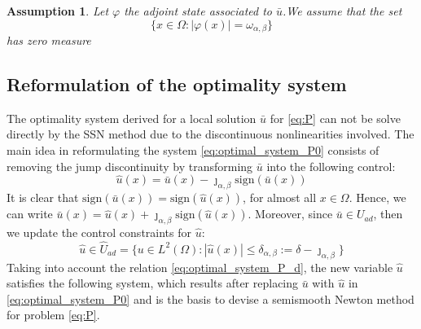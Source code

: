 \documentclass[11pt,a4paper]{amsart}
\newcommand{\om}{\Omega}
\newcommand{\sign}{\mathrm{sign}}
\newcounter{theassumption}
\newtheorem{assumption}[theassumption]{{Assumption}}
\begin{document}
\begin{assumption}\label{as:zeromeasure}
Let $\varphi$ the adjoint state associated to $\bar u$.We assume that the set 
$$\{x\in\om: |\varphi(x)|=\omega_{\alpha,\beta}\}$$
has zero measure
\end{assumption}


\subsection{Reformulation of the optimality system}
The optimality system derived for a local solution $\bar u$ for \eqref{eq:P} can not be solve directly by the SSN method due to the discontinuous nonlinearities involved.  The main idea in reformulating the system \eqref{eq:optimal_system_P0} consists of removing the jump discontinuity by transforming $\bar u$ into the following control:
\begin{equation}\label{eq:change_variable}
    \hat{u}(x)=\bar u(x)-\jmath_{\alpha,\beta}\sign(\bar u(x))
\end{equation}
It is clear that $\sign(\bar u(x))= \sign(\hat u(x))$, for almost all $x\in \om$. Hence, we can write $ \bar u(x) =  \hat u(x)+\jmath_{\alpha,\beta}\sign(\hat u(x))$. Moreover, since $\bar u \in U_{ad}$, then we update the control constraints for $\hat u$:
\begin{equation}
    \hat u \in  \hat{U}_{ad}=\{ u \in L^2(\om): |\hat u(x)|\leq \delta_{\alpha,\beta}:=\delta-\jmath_{\alpha,\beta}\}
\end{equation}
Taking into account the relation \eqref{eq:optimal_system_P_d}, the new variable $\hat u$ satisfies the following system, which results after replacing $\bar u$ with $\hat u$ in \eqref{eq:optimal_system_P0} and is the basis to devise a semismooth Newton method for problem \eqref{eq:P}.
\end{document}
